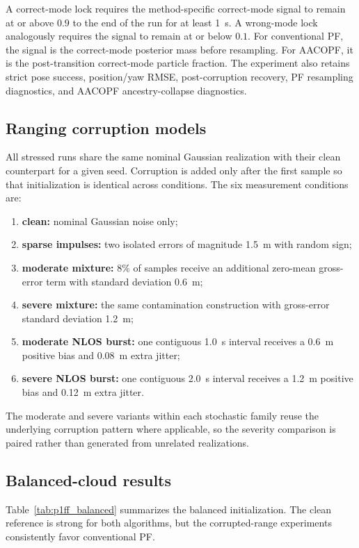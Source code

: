A correct-mode lock requires the method-specific correct-mode signal to remain at or above $0.9$ to the end of the run for at least \SI{1}{s}. A wrong-mode lock analogously requires the signal to remain at or below $0.1$. For conventional PF, the signal is the correct-mode posterior mass before resampling. For AACOPF, it is the post-transition correct-mode particle fraction. The experiment also retains strict pose success, position/yaw RMSE, post-corruption recovery, PF resampling diagnostics, and AACOPF ancestry-collapse diagnostics.

\subsection{Ranging corruption models}
All stressed runs share the same nominal Gaussian realization with their clean counterpart for a given seed. Corruption is added only after the first sample so that initialization is identical across conditions. The six measurement conditions are:
\begin{enumerate}
    \item \textbf{clean:} nominal Gaussian noise only;
    \item \textbf{sparse impulses:} two isolated errors of magnitude \SI{1.5}{m} with random sign;
    \item \textbf{moderate mixture:} $8\%$ of samples receive an additional zero-mean gross-error term with standard deviation \SI{0.6}{m};
    \item \textbf{severe mixture:} the same contamination construction with gross-error standard deviation \SI{1.2}{m};
    \item \textbf{moderate NLOS burst:} one contiguous \SI{1.0}{s} interval receives a \SI{0.6}{m} positive bias and \SI{0.08}{m} extra jitter;
    \item \textbf{severe NLOS burst:} one contiguous \SI{2.0}{s} interval receives a \SI{1.2}{m} positive bias and \SI{0.12}{m} extra jitter.
\end{enumerate}
The moderate and severe variants within each stochastic family reuse the underlying corruption pattern where applicable, so the severity comparison is paired rather than generated from unrelated realizations.

\subsection{Balanced-cloud results}
Table~\ref{tab:p1ff_balanced} summarizes the balanced initialization. The clean reference is strong for both algorithms, but the corrupted-range experiments consistently favor conventional PF.

